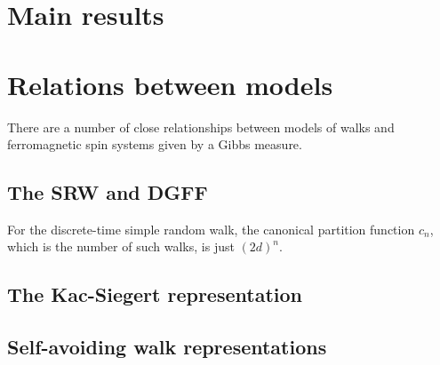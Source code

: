 \section{Main results}


\section{Relations between models}

There are a number of close relationships between models of walks and ferromagnetic spin
systems given by a Gibbs measure.


\subsection{The SRW and DGFF}


For the discrete-time simple random walk, the canonical partition function $c_n$,
which is the number of such walks, is just $(2 d)^n$.


\subsection{The Kac-Siegert representation}



\subsection{Self-avoiding walk representations}

